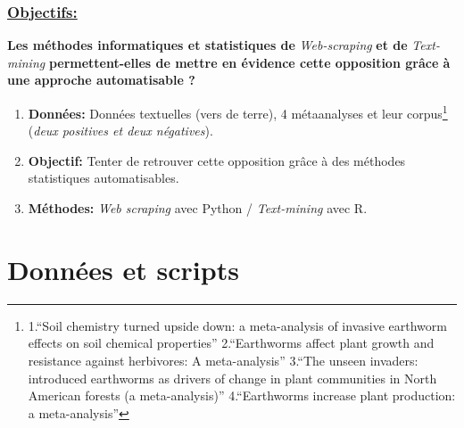 \documentclass[xcolor=dvipsnames]{beamer}
\begin{document}
	\begin{frame}
		\frametitle{\underline{Objectifs:}}
		\textbf{Les méthodes informatiques et statistiques de} \textit{Web-scraping} \textbf{et de} \textit{Text-mining} \textbf{permettent-elles de mettre en évidence cette opposition grâce à une approche automatisable ?}
		
		\vspace{\baselineskip}
		\begin{enumerate}
				\item \textbf{Données:} Données textuelles (vers de terre), 4 métaanalyses et leur corpus\footnote{
					1.“Soil chemistry turned upside down: a meta-analysis of invasive earthworm effects on soil chemical properties”
					2.“Earthworms affect plant growth and resistance against herbivores: A meta-analysis”
					3.“The unseen invaders: introduced earthworms as drivers of change in plant communities in North American forests (a meta-analysis)”
					4.“Earthworms increase plant production: a meta-analysis”} (\textit{deux positives et deux négatives}).
				\item \textbf{Objectif:} Tenter de retrouver cette opposition grâce à des méthodes statistiques automatisables.
				\item \textbf{Méthodes:} \textit{Web scraping} avec Python / \textit{Text-mining} avec R.
			\end{enumerate}
	\end{frame}

	\section*{Données et scripts}
\end{document}
